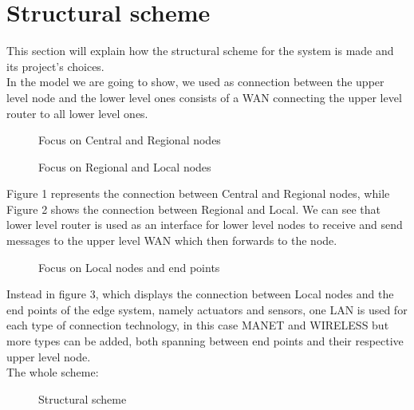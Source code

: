 \documentclass[11pt]{article}
\begin{document}
\section{Structural scheme}
This section will explain how the structural scheme for the system is made and its project's choices.\\
In the model we are going to show, we used as connection between the upper level node and the lower level ones consists of a WAN connecting the upper level router to all lower level ones.\\
\begin{figure}[H]
	\hspace*{-3.75cm}
	\centering
  \frame{}
  \caption{Focus on Central and Regional nodes}
\end{figure}
\begin{figure}[H]
	\hspace*{-3.75cm}
	\frame{}
	\caption{Focus on Regional and Local nodes}
\end{figure}
Figure 1 represents the connection between Central and Regional nodes, while Figure 2 shows the connection between Regional and Local. We can  see that lower level router is used as an interface for lower level nodes to receive and send messages to the upper level WAN which then forwards to the node. \\
\begin{figure}[H]
	\hspace*{-3.75cm}
  \frame{}
  \caption{Focus on Local nodes and end points}
\end{figure}
Instead in figure 3, which displays the connection between Local nodes and the end points of the edge system, namely actuators and sensors, one LAN is used for each type of connection technology, in this case MANET and WIRELESS but more types can be added, both spanning between end points and their respective upper level node.\\
The whole scheme:
\begin{figure}[H]
	\hspace*{-3.75cm}
	\frame{}
  \caption{Structural scheme}
\end{figure}
\end{document}
